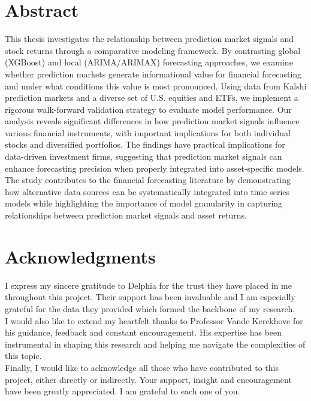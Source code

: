 \documentclass[12pt]{report}
\begin{document}



\chapter*{Abstract}

This thesis investigates the relationship between prediction market signals and stock returns through a comparative modeling framework. By contrasting global (XGBoost) and local (ARIMA/ARIMAX) forecasting approaches, we examine whether prediction markets generate informational value for financial forecasting and under what conditions this value is most pronounced. Using data from Kalshi prediction markets and a diverse set of U.S. equities and ETFs, we implement a rigorous walk-forward validation strategy to evaluate model performance. Our analysis reveals significant differences in how prediction market signals influence various financial instruments, with important implications for both individual stocks and diversified portfolios. The findings have practical implications for data-driven investment firms, suggesting that prediction market signals can enhance forecasting precision when properly integrated into asset-specific models. The study contributes to the financial forecasting literature by demonstrating how alternative data sources can be systematically integrated into time series models while highlighting the importance of model granularity in capturing relationships between prediction market signals and asset returns.



\chapter*{Acknowledgments}

I express my sincere gratitude to Delphia for the trust they have placed in me throughout this project. Their support has been invaluable and I am especially grateful for the data they provided which formed the backbone of my research.\\

I would also like to extend my heartfelt thanks to Professor Vande Kerckhove for his guidance, feedback and constant encouragement. His expertise has been instrumental in shaping this research and helping me navigate the complexities of this topic.\\

Finally, I would like to acknowledge all those who have contributed to this project, either directly or indirectly. Your support, insight and encouragement have been greatly appreciated. I am grateful to each one of you.
\end{document}
